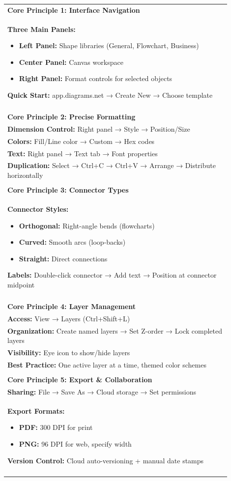 \documentclass{article}
\begin{document}
\begin{longtable}{|p{0.9\linewidth}|}
\hline
\textbf{Core Principle 1: Interface Navigation} \\[0.5em]
\textbf{Three Main Panels:}
\begin{itemize}[leftmargin=1em]
\item \textbf{Left Panel:} Shape libraries (General, Flowchart, Business)
\item \textbf{Center Panel:} Canvas workspace
\item \textbf{Right Panel:} Format controls for selected objects
\end{itemize}
\textbf{Quick Start:} app.diagrams.net → Create New → Choose template \\
\\
\hline
\textbf{Core Principle 2: Precise Formatting} \\[0.5em]
\textbf{Dimension Control:} Right panel → Style → Position/Size \\
\textbf{Colors:} Fill/Line color → Custom → Hex codes \\
\textbf{Text:} Right panel → Text tab → Font properties \\
\textbf{Duplication:} Select → Ctrl+C → Ctrl+V → Arrange → Distribute horizontally \\
\\
\hline
\textbf{Core Principle 3: Connector Types} \\[0.5em]
\textbf{Connector Styles:}
\begin{itemize}[leftmargin=1em]
\item \textbf{Orthogonal:} Right-angle bends (flowcharts)
\item \textbf{Curved:} Smooth arcs (loop-backs)
\item \textbf{Straight:} Direct connections
\end{itemize}
\textbf{Labels:} Double-click connector → Add text → Position at connector midpoint \\
\\
\hline
\textbf{Core Principle 4: Layer Management} \\[0.5em]
\textbf{Access:} View → Layers (Ctrl+Shift+L) \\
\textbf{Organization:} Create named layers → Set Z-order → Lock completed layers \\
\textbf{Visibility:} Eye icon to show/hide layers \\
\textbf{Best Practice:} One active layer at a time, themed color schemes \\
\\
\hline
\textbf{Core Principle 5: Export \& Collaboration} \\[0.5em]
\textbf{Sharing:} File → Save As → Cloud storage → Set permissions \\
\textbf{Export Formats:}
\begin{itemize}[leftmargin=1em]
\item \textbf{PDF:} 300 DPI for print
\item \textbf{PNG:} 96 DPI for web, specify width
\end{itemize}
\textbf{Version Control:} Cloud auto-versioning + manual date stamps \\
\\
\hline
\end{longtable}
\end{document}
